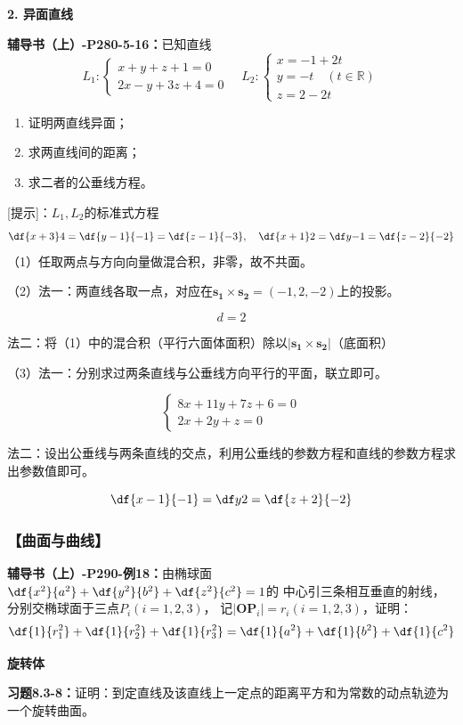 {\bf 2. 异面直线}

{\bf 辅导书（上）-P280-5-16：}已知直线
$$L_1:\left\{\begin{array}{l}
	x+y+z+1=0\\
	2x-y+3z+4=0
\end{array}\right.
\quad
L_2:\left\{\begin{array}{l}
	x=-1+2t\\
	y=-t\quad(t\in\mathbb{R})\\
	z=2-2t
\end{array}\right.
$$
\begin{enumerate}[(1)]
  \setlength{\itemindent}{1cm}
  \item 证明两直线异面；
  \item 求两直线间的距离；
  \item 求二者的公垂线方程。
\end{enumerate}

[提示]：$L_1,L_2$的标准式方程
$$\df{x+3}4=\df{y-1}{-1}=\df{z-1}{-3},\quad
\df{x+1}2=\df y{-1}=\df{z-2}{-2}$$
（1）任取两点与方向向量做混合积，非零，故不共面。

（2）法一：两直线各取一点，对应在$\bm{s_1}\times\bm{s_2}=(-1,2,-2)$上的投影。

$$d=2$$

法二：将（1）中的混合积（平行六面体面积）除以$|\bm{s_1}\times\bm{s_2}|$（底面积）

（3）法一：分别求过两条直线与公垂线方向平行的平面，联立即可。

$$\left\{\begin{array}{l}
	8x+11y+7z+6=0\\
	2x+2y+z=0
\end{array}\right.$$

法二：设出公垂线与两条直线的交点，利用公垂线的参数方程和直线的参数方程求出参数值即可。

$$\df{x-1}{-1}=\df y2=\df{z+2}{-2}$$

\subsubsection{【曲面与曲线】}

{\bf 辅导书（上）-P290-例18：}由椭球面$\df{x^2}{a^2}+\df{y^2}{b^2}+\df{z^2}{c^2}=1$的
中心引三条相互垂直的射线，分别交椭球面于三点$P_i(i=1,2,3)$，
记$|\bm{OP}_i|=r_i(i=1,2,3)$，证明：
$$\df{1}{r_1^2}+\df{1}{r_2^2}+\df{1}{r_3^2}
=\df{1}{a^2}+\df{1}{b^2}+\df{1}{c^2}$$

{\bf 旋转体}

{\bf 习题8.3-8：}证明：到定直线及该直线上一定点的距离平方和为常数的动点轨迹为一个旋转曲面。

